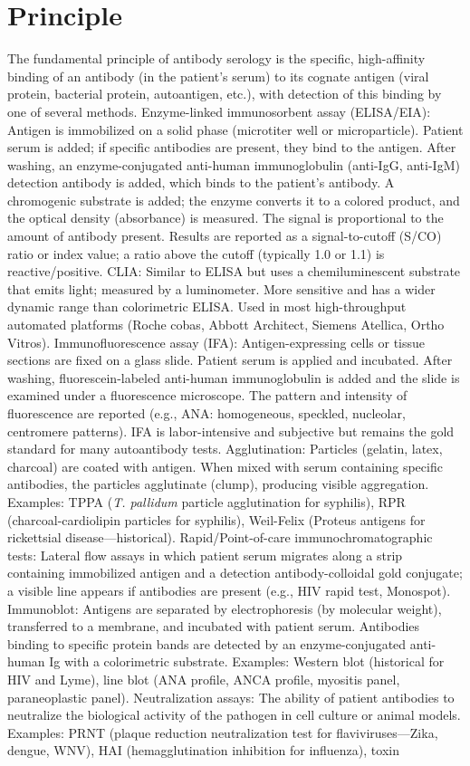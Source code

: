 \section*{Principle}
The fundamental principle of antibody serology is the specific, high-affinity binding of an antibody (in the patient's serum) to its cognate antigen (viral protein, bacterial protein, autoantigen, etc.), with detection of this binding by one of several methods. Enzyme-linked immunosorbent assay (ELISA/EIA): Antigen is immobilized on a solid phase (microtiter well or microparticle). Patient serum is added; if specific antibodies are present, they bind to the antigen. After washing, an enzyme-conjugated anti-human immunoglobulin (anti-IgG, anti-IgM) detection antibody is added, which binds to the patient's antibody. A chromogenic substrate is added; the enzyme converts it to a colored product, and the optical density (absorbance) is measured. The signal is proportional to the amount of antibody present. Results are reported as a signal-to-cutoff (S/CO) ratio or index value; a ratio above the cutoff (typically 1.0 or 1.1) is reactive/positive. CLIA: Similar to ELISA but uses a chemiluminescent substrate that emits light; measured by a luminometer. More sensitive and has a wider dynamic range than colorimetric ELISA. Used in most high-throughput automated platforms (Roche cobas, Abbott Architect, Siemens Atellica, Ortho Vitros). Immunofluorescence assay (IFA): Antigen-expressing cells or tissue sections are fixed on a glass slide. Patient serum is applied and incubated. After washing, fluorescein-labeled anti-human immunoglobulin is added and the slide is examined under a fluorescence microscope. The pattern and intensity of fluorescence are reported (e.g., ANA: homogeneous, speckled, nucleolar, centromere patterns). IFA is labor-intensive and subjective but remains the gold standard for many autoantibody tests. Agglutination: Particles (gelatin, latex, charcoal) are coated with antigen. When mixed with serum containing specific antibodies, the particles agglutinate (clump), producing visible aggregation. Examples: TPPA (\textit{T. pallidum} particle agglutination for syphilis), RPR (charcoal-cardiolipin particles for syphilis), Weil-Felix (Proteus antigens for rickettsial disease---historical). Rapid/Point-of-care immunochromatographic tests: Lateral flow assays in which patient serum migrates along a strip containing immobilized antigen and a detection antibody-colloidal gold conjugate; a visible line appears if antibodies are present (e.g., HIV rapid test, Monospot). Immunoblot: Antigens are separated by electrophoresis (by molecular weight), transferred to a membrane, and incubated with patient serum. Antibodies binding to specific protein bands are detected by an enzyme-conjugated anti-human Ig with a colorimetric substrate. Examples: Western blot (historical for HIV and Lyme), line blot (ANA profile, ANCA profile, myositis panel, paraneoplastic panel). Neutralization assays: The ability of patient antibodies to neutralize the biological activity of the pathogen in cell culture or animal models. Examples: PRNT (plaque reduction neutralization test for flaviviruses---Zika, dengue, WNV), HAI (hemagglutination inhibition for influenza), toxin 